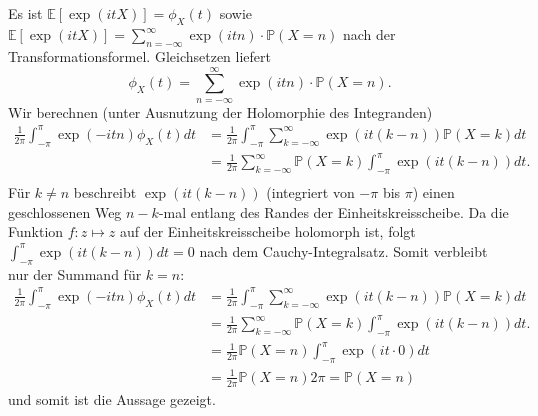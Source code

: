 \documentclass[a4paper]{article}
\begin{document}
\addtocounter{subsection}{1}

\subsection{}

Es ist $\mathds{E}[\exp(itX)] = \phi_X(t)$ sowie $\mathds{E}[\exp(itX)] = \sum_{n = - \infty}^{\infty} \exp(itn) \cdot \mathds{P}(X = n)$ nach der Transformationsformel. Gleichsetzen liefert
\begin{equation*}
    \phi_X(t) = \sum_{n = - \infty}^{\infty} \exp(itn) \cdot \mathds{P}(X = n)\text{.}
\end{equation*}
Wir berechnen (unter Ausnutzung der Holomorphie des Integranden)
\begin{align*}
    \frac{1}{2\pi} \int_{-\pi}^{\pi} \exp(-itn) \phi_X(t) dt
    &= \frac{1}{2 \pi} \int_{-\pi}^{\pi} \sum_{k=-\infty}^{\infty} \exp(it(k-n)) \mathds{P}(X = k) dt\\
    &= \frac{1}{2 \pi} \sum_{k=-\infty}^{\infty} \mathds{P}(X = k)  \int_{-\pi}^{\pi}  \exp(it(k-n)) dt\text{.}\\
\end{align*}
Für $k \neq n$ beschreibt $\exp(it(k-n))$ (integriert von $-\pi$ bis $\pi$) einen geschlossenen Weg $n-k$-mal entlang des Randes der Einheitskreisscheibe. Da die Funktion $f: z \mapsto z$ auf der Einheitskreisscheibe holomorph ist, folgt $\int_{-\pi}^{\pi}  \exp(it(k-n)) dt = 0$ nach dem Cauchy-Integralsatz. Somit verbleibt nur der Summand für $k = n$:
\begin{align*}
    \frac{1}{2\pi} \int_{-\pi}^{\pi} \exp(-itn) \phi_X(t) dt
    &= \frac{1}{2 \pi} \int_{-\pi}^{\pi} \sum_{k=-\infty}^{\infty} \exp(it(k-n)) \mathds{P}(X = k) dt\\
    &= \frac{1}{2 \pi} \sum_{k=-\infty}^{\infty} \mathds{P}(X = k)  \int_{-\pi}^{\pi}  \exp(it(k-n)) dt\text{.}\\
    &= \frac{1}{2 \pi} \mathds{P}(X = n) \int_{-\pi}^{\pi} \exp(i t \cdot 0) dt \\
    &= \frac{1}{2 \pi} \mathds{P}(X = n) 2 \pi = \mathds{P}(X = n)
\end{align*}
und somit ist die Aussage gezeigt.

\subsection{}
\end{document}
